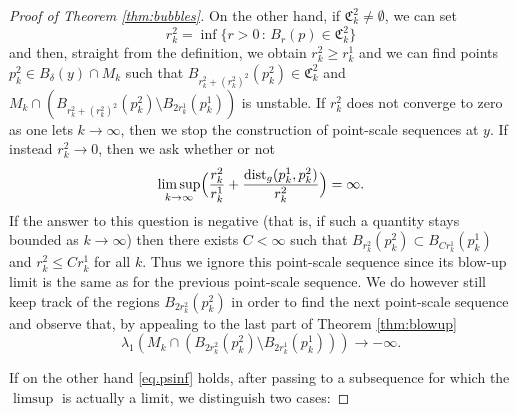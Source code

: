 \documentclass[JEP,XML,SOM,Unicode]{cedram}
\newcounter{cas}
\renewcommand{\thecas}{\Roman{cas}}
\newcommand{\sep}{\,:\,}
\DeclareMathOperator{\dist}{dist}
\theoremstyle{definition}
\begin{document}
\begin{proof}[Proof of Theorem \ref{thm:bubbles}]
On the other hand, if $\mathfrak{C}^2_k \neq \emptyset$, we can set
\[
r^2_k = \inf \bigl\{r>0 \sep B_r(p)\in \mathfrak{C}^2_k\bigr\}
\]
and then, straight from the definition, we obtain $r^2_k\geq r^1_k$
and we can find points $p^2_k\in B_\delta(y)\cap M_k$ such that $B_{r^2_k+(r^2_k)^2}(p^2_k)\in \mathfrak{C}^2_k$ and $M_k\cap (B_{r^2_k+(r^2_k)^2}(p^2_k)\setminus B_{2r^1_k}(p^1_k))$ is unstable. If $r^2_k$ does not converge to zero as one lets $k\to\infty$, then we stop the construction of point-scale sequences at $y$.
If instead $r^2_k\to 0$, then we ask whether or not
\begin{equation}\label{eq.psinf}
\limsup_{k\to \infty} \Bigl(\frac{r^2_k}{r^1_k} + \frac{\dist_g(p_k^1,p_k^2)}{r^2_k} \Bigr)= \infty.
\end{equation}
If the answer to this question is negative (that is, if such a quantity stays bounded as $k\to\infty$) then there exists $C<\infty$ such that $B_{r^2_k}(p^2_k)\subset B_{Cr^1_k}(p^1_k)$ and $r^2_k\leq C r^1_k$ for all $k$. Thus we ignore this point-scale sequence since its blow-up limit is the same as for the previous point-scale sequence. We do however still keep track of the regions $B_{2r^2_k}(p^2_k)$ in order to find the next point-scale sequence and observe that, by appealing to the last part of Theorem \ref{thm:blowup}
$$\lambda_1(M_k\cap (B_{2r^2_k}(p^2_k)\setminus B_{2r^1_k}(p^1_k))) \to -\infty.$$

If on the other hand \eqref{eq.psinf} holds, after passing to a subsequence for which the $\limsup$ is actually a limit, we distinguish two cases:

\renewcommand{\thecas}{\arabic{cas}}

\end{proof}
\end{document}
